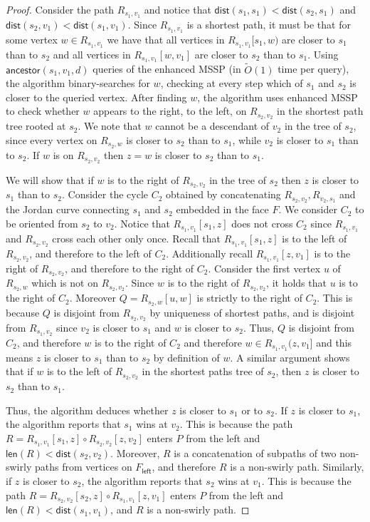 \documentclass{article}
\newcommand{\leftside}{\mathsf{left}}
\newcommand{\dist}{\mathsf{dist}}
\newcommand{\ancestor}{\mathsf{ancestor}}
\newcommand{\len}{\mathsf{len}}
\newcommand{\Otild}{\tilde{O}}
\begin{document}
\begin{proof}
Consider the path $R_{s_1,v_1}$ and notice that $\dist(s_1,s_1)<\dist(s_2,s_1)$ and $\dist(s_2,v_1)<\dist(s_1,v_1)$.
Since $R_{s_1,v_1}$ is a shortest path, it must be that for some  vertex $w\in R_{s_1,v_1}$  we have that all vertices in $R_{s_1,v_1}[s_1,w)$ are closer to $s_1$ than to $s_2$ and all vertices in $R_{s_1,v_1}[w,v_1]$ are closer to $s_2$ than to $s_1$.
Using $\ancestor(s_1,v_1,d)$ queries of
the enhanced MSSP (in $\Otild(1)$ time per query), the algorithm binary-searches for $w$, checking at every step which of $s_1$ and $s_2$ is closer to the queried vertex.
After finding $w$, the algorithm uses enhanced MSSP
to check whether $w$ appears to the right, to the left, on $R_{s_2,v_2}$
in the shortest path tree rooted at $s_2$.
We note that $w$ cannot be a descendant of $v_2$ in the tree of $s_2$, since every vertex on $R_{s_2,w}$ is closer to $s_2$ than to $s_1$, while $v_2$ is closer to $s_1$ than to $s_2$.
If $w$ is on $R_{s_2,v_2}$ then $z=w$ is closer to $s_2$ than to $s_1$.

We will show that if $w$ is to the right of $R_{s_2,v_2}$ in the tree of $s_2$ then $z$ is closer to $s_1$ than to $s_2$.
Consider the cycle $C_2$ obtained by concatenating $R_{s_2,v_2}, R_{v_2,s_1}$ and the Jordan curve connecting $s_1$ and $s_2$ embedded in the face $F$.
We consider $C_2$ to be oriented from $s_2$ to $v_2$.
Notice that $R_{s_1,v_1}[s_1,z]$ does not cross $C_2$ since $R_{s_1,v_1}$ and $R_{s_2,v_2}$ cross each other only once.
Recall that $R_{s_1,v_1}[s_1,z]$ is to the left of $R_{s_2,v_2}$, and therefore to the left of $C_2$.
Additionally recall $R_{s_1,v_1}[z,v_1]$ is to the right of $R_{s_2,v_2}$, and therefore to the right of $C_2$.
Consider the first vertex $u$ of $R_{s_2,w}$ which is not on $R_{s_2,v_2}$.
Since $w$ is to the right of $R_{s_2,v_2}$, it holds that $u$ is to the right of $C_2$.
Moreover $Q=R_{s_2,w}[u,w]$ is strictly to the right of $C_2$.
This is because $Q$ is disjoint from $R_{s_2,v_2}$ by uniqueness of shortest paths, and is disjoint from $R_{s_1,v_2}$ since $v_2$ is closer to $s_1$ and $w$ is closer to $s_2$.
Thus, $Q$ is disjoint from $C_2$, and therefore $w$ is to the right of $C_2$ and therefore $w\in R_{s_1,v_1}(z,v_1]$ and this means $z$ is closer to $s_1$ than to $s_2$ by definition of $w$.
A similar argument shows that if $w$ is to the left of $R_{s_2,v_2}$ in the shortest paths tree of $s_2$, then $z$ is closer to $s_2$ than to $s_1$.

Thus, the algorithm deduces whether $z$ is closer to $s_1$ or to $s_2$.
If $z$ is closer to $s_1$, the algorithm reports that $s_1$ wins at $v_2$.
This is because the path $R=R_{s_1,v_1}[s_1,z]\circ R_{s_2,v_2}[z,v_2]$ enters $P$ from the left and $\len(R)<\dist(s_2,v_2)$.
Moreover, $R$ is a concatenation of subpaths of two non-swirly paths from vertices on $F_{\leftside}$, and therefore $R$ is a non-swirly path.
Similarly, if $z$ is closer to $s_2$, the algorithm reports that $s_2$ wins at $v_1$.
This is because the path $R=R_{s_2,v_2}[s_2,z]\circ R_{s_1,v_1}[z,v_1]$ enters $P$ from the left and $\len(R)<\dist(s_1,v_1)$, and $R$ is a non-swirly path.


\end{proof}
\end{document}
